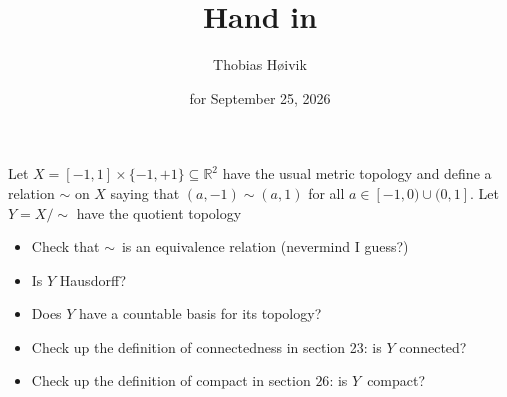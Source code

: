 

\title{\huge{Hand in}}
\author{\LARGE{Thobias Høivik}}
\date{for September 25, 2026}


\maketitle

\newpage
\begin{prob*}[1]
    Let $X = [-1,1] \times \{-1,+1\} \subseteq \mathbb R^2$ have 
    the usual metric topology and define a relation 
    $\sim$ on $X$ saying that $(a,-1) \sim (a,1)$ for all 
    $a \in [-1,0) \cup (0,1]$. Let $Y = X /\sim$ have 
    the quotient topology 

    \begin{itemize}
        \item Check that $\sim$ is an equivalence relation 
            (nevermind I guess?) 
        \item Is $Y$ Hausdorff? 
        \item Does $Y$ have a countable basis for its 
            topology? 
        \item Check up the definition of connectedness in 
            section 23: is $Y$ connected? 
        \item Check up the definition of compact in section 
            $26$: is $Y$ compact? 
    \end{itemize}
\end{prob*}



